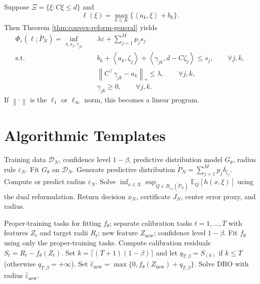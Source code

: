 \documentclass[11pt]{article}
\newcommand{\E}{\mathbb{E}}
\newcommand{\XiSet}{\Xi}
\newcommand{\1}{\mathbf{1}}
\newcommand{\Ptil}{\widetilde P_N}
\newcommand{\Pbar}{\bar P_N}
\newcommand{\inner}[2]{\left\langle #1,#2\right\rangle}
\newcommand{\norm}[1]{\left\lVert #1\right\rVert}
\begin{document}
Suppose $\XiSet=\{\xi:C\xi\le d\}$ and
\begin{equation}
    \ell(\xi)=\max_{k\le K}\{\inner{a_k}{\xi}+b_k\}.
\end{equation}
Then Theorem \ref{thm:convex-reform-general} yields
\begin{equation}\label{eq:pwa-polytope}
\begin{aligned}
\Phi_\varepsilon(\ell;\Pbar)=
\inf_{\lambda,s_j,\gamma_{jk}}\quad
&\lambda\varepsilon+\sum_{j=1}^Mp_js_j\\
\mathrm{s.t.}\quad
&b_k+\inner{a_k}{\zeta_j}+\inner{\gamma_{jk}}{d-C\zeta_j}\le s_j,
\qquad \forall j,k,\\
&\norm{C^\top\gamma_{jk}-a_k}_*\le\lambda,
\qquad \forall j,k,\\
&\gamma_{jk}\ge0,
\qquad \forall j,k.
\end{aligned}
\end{equation}
If $\norm{\cdot}$ is the $\ell_1$ or $\ell_\infty$ norm, this becomes a linear program.

\section{Algorithmic Templates}

\begin{algorithm}[ht]
\caption{Predictive-center Wasserstein DRO}
\begin{algorithmic}[1]
\Require Training data $\mathcal D_N$, confidence level $1-\beta$, predictive distribution model $G_\theta$, radius rule $\varepsilon_N$.
\State Fit $G_\theta$ on $\mathcal D_N$.
\State Generate predictive distribution $\Ptil=\sum_{j=1}^Mp_j\delta_{\zeta_j}$.
\State Compute or predict radius $\varepsilon_N$.
\State Solve $\inf_{x\in X}\sup_{Q\in B_{\varepsilon_N}(\Ptil)}\E_Q[h(x,\xi)]$ using the dual reformulation.
\State Return decision $x_N$, certificate $J_N$, center error proxy, and radius.
\end{algorithmic}
\end{algorithm}

\begin{algorithm}[ht]
\caption{Conformal learned radius across exchangeable tasks}
\begin{algorithmic}[1]
\Require Proper-training tasks for fitting $f_\theta$; separate calibration tasks $t=1,\ldots,T$ with features $Z_t$ and target radii $R_t$; new feature $Z_{\mathrm{new}}$; confidence level $1-\beta$.
\State Fit $f_\theta$ using only the proper-training tasks.
\State Compute calibration residuals $S_t=R_t-f_\theta(Z_t)$.
\State Set $k=\lceil(T+1)(1-\beta)\rceil$ and let $q_{T,\beta}=S_{(k)}$ if $k\le T$ (otherwise $q_{T,\beta}=+\infty$).
\State Set $\widehat\varepsilon_{\mathrm{new}}=\max\{0,f_\theta(Z_{\mathrm{new}})+q_{T,\beta}\}$.
\State Solve DRO with radius $\widehat\varepsilon_{\mathrm{new}}$.
\end{algorithmic}
\end{algorithm}
\end{document}
